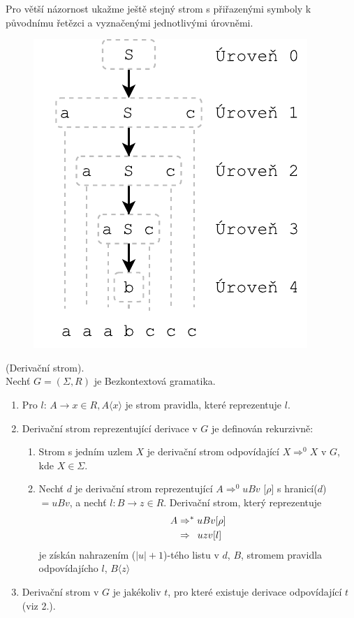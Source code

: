 \noindent
Pro větší názornost ukažme ještě stejný strom s přiřazenými symboly k původnímu
řetězci a vyznačenými jednotlivými úrovněmi.

\begin{figure}[H]
  \centering
  \includegraphics{fig/Derivations2.pdf}
\end{figure}

\begin{defn}
  (Derivační strom). \cite[str. 92]{MedunaIFJ}\\
  Nechť $G = (\Sigma, R)$ je Bezkontextová gramatika.\\
  \begin{enumerate}
    \item Pro $l$: $A \rightarrow x \in R, A\langle x\rangle$ je strom pravidla, které reprezentuje $l$.
    \item Derivační strom reprezentující derivace v $G$ je definován rekurzivně:
    \begin{enumerate}
      \item Strom s jedním uzlem $X$ je derivační strom odpovídající $X \Rightarrow^0 X$ v $G$, kde $X \in \Sigma$.
      \item Nechť $d$ je derivační strom reprezentující
            $A \Rightarrow^0 uBv$ [$\rho$] s hranicí($d$) $ = uBv$, a nechť $l: B \rightarrow z \in R$.
            Derivační strom, který reprezentuje
            \begin{align}
                A & \Rightarrow^* uBv [\rho] \nonumber\\
                  & \Rightarrow \hphantom{*} uzv [l] \nonumber
            \end{align}
            je získán nahrazením ($|u|+1$)-tého listu v $d$, $B$, stromem pravidla odpovídajícho $l$, $B\langle z\rangle$
    \end{enumerate}
    \item Derivační strom v $G$ je jakékoliv $t$, pro které existuje derivace odpovídající $t$ (viz 2.).
  \end{enumerate}
\end{defn}

